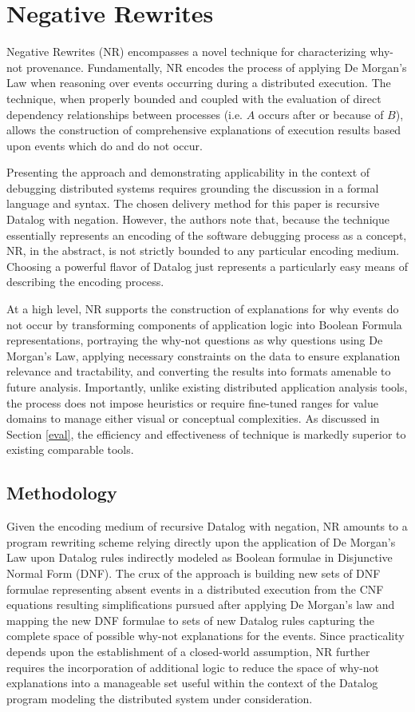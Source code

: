 
\section{Negative Rewrites} \label{neg_rewrites}
Negative Rewrites (NR) encompasses a novel technique for characterizing why-not provenance. Fundamentally, NR encodes the process of applying De Morgan's Law \cite{Epp:2010:DMA:1941983} when reasoning over events occurring during a distributed execution. The technique, when properly bounded and coupled with the evaluation of direct dependency relationships between processes (i.e. $A$ occurs after or because of $B$), allows the construction of comprehensive explanations of execution results based upon events which do and do not occur. 

Presenting the approach and demonstrating applicability in the context of debugging distributed systems requires grounding the discussion in a formal language and syntax. The chosen delivery method for this paper is recursive Datalog with negation. However, the authors note that, because the technique essentially represents an encoding of the software debugging process as a concept, NR, in the abstract, is not strictly bounded to any particular encoding medium. Choosing a powerful flavor of Datalog just represents a particularly easy means of describing the encoding process.

At a high level, NR supports the construction of explanations for why events do not occur by transforming components of application logic into Boolean Formula representations, portraying the why-not questions as why questions using De Morgan's Law, applying necessary constraints on the data to ensure explanation relevance and tractability, and converting the results into formats amenable to future analysis. Importantly, unlike existing distributed application analysis tools, the process does not impose heuristics or require fine-tuned ranges for value domains to manage either visual or conceptual complexities. As discussed in Section \ref{eval}, the efficiency and effectiveness of technique is markedly superior to existing comparable tools.

\subsection{Methodology}
Given the encoding medium of recursive Datalog with negation, NR amounts to a program rewriting scheme relying directly upon the application of De Morgan's Law upon Datalog rules indirectly modeled as Boolean formulae in Disjunctive Normal Form (DNF). The crux of the approach is building new sets of DNF formulae representing absent events in a distributed execution from the CNF equations resulting simplifications pursued after applying De Morgan's law and mapping the new DNF formulae to sets of new Datalog rules capturing the complete space of possible why-not explanations for the events. Since practicality depends upon the establishment of a closed-world assumption, NR further requires the incorporation of additional logic to reduce the space of why-not explanations into a manageable set useful within the context of the Datalog program modeling the distributed system under consideration.

